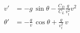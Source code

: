 \begin{align}
  v' & = - g\, \sin\theta - \frac{C_D}{C_L} \frac{g}{v_t^2} v^2 \\
   \theta' & = - \frac{g}{v}\,\cos\theta + \frac{g}{v_t^2}\, v
   \end{align}

